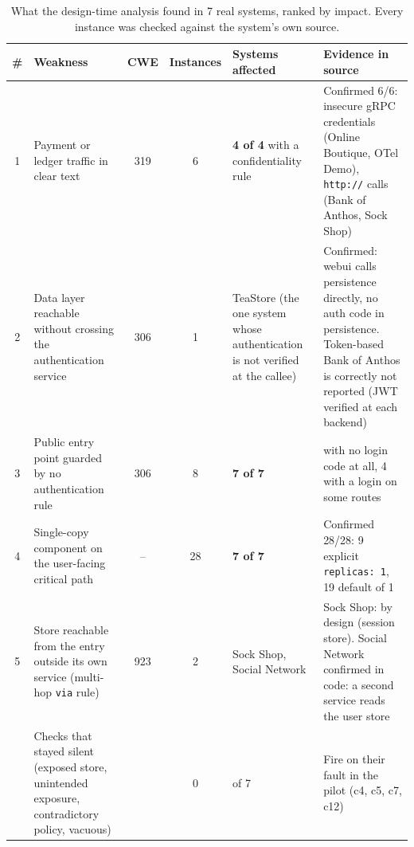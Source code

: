 \documentclass[conference]{IEEEtran}
\begin{document}
\begin{table}[t]
\centering\caption{What the design-time analysis found in 7 real systems, ranked by impact. Every instance was checked against the system's own source.}
\label{tab:highlights}\footnotesize
\begin{tabularx}{\textwidth}{@{}c>{\raggedright\arraybackslash}p{4.1cm}c c >{\raggedright\arraybackslash}p{2.3cm} >{\raggedright\arraybackslash}X@{}}
\toprule
\# & Weakness & CWE & Instances & Systems affected & Evidence in source\\
\midrule
1 & Payment or ledger traffic in clear text & 319 & 6 & \textbf{4 of 4} with a confidentiality rule & Confirmed 6/6: insecure gRPC credentials (Online Boutique, OTel Demo), \texttt{http://} calls (Bank of Anthos, Sock Shop)\\
2 & Data layer reachable without crossing the authentication service & 306 & 1 & TeaStore (the one system whose authentication is not verified at the callee) & Confirmed: webui calls persistence directly, no auth code in persistence. Token-based Bank of Anthos is correctly not reported (JWT verified at each backend)\\
3 & Public entry point guarded by no authentication rule & 306 & 8 & \textbf{7 of 7} & 3 with no login code at all, 4 with a login on some routes\\
4 & Single-copy component on the user-facing critical path & -- & 28 & \textbf{7 of 7} & Confirmed 28/28: 9 explicit \texttt{replicas: 1}, 19 default of 1\\
5 & Store reachable from the entry outside its own service (multi-hop \texttt{via} rule) & 923 & 2 & Sock Shop, Social Network & Sock Shop: by design (session store). Social Network confirmed in code: a second service reads the user store\\
\midrule
 & Checks that stayed silent (exposed store, unintended exposure, contradictory policy, vacuous) & & 0 & 0 of 7 & Fire on their fault in the pilot (c4, c5, c7, c12)\\
\bottomrule
\end{tabularx}
\end{table}
\end{document}
